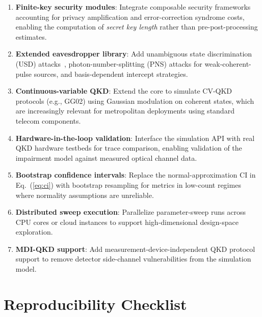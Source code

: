\documentclass[journal]{IEEEtran}
\begin{document}
\begin{enumerate}
  \item \textbf{Finite-key security modules}: Integrate composable
        security frameworks~\cite{tomamichel2012} accounting for
        privacy amplification and error-correction syndrome costs,
        enabling the computation of \emph{secret key length} rather
        than pre-post-processing estimates.

  \item \textbf{Extended eavesdropper library}: Add unambiguous state
        discrimination (USD) attacks~\cite{ivanovic1987},
        photon-number-splitting (PNS) attacks for weak-coherent-pulse
        sources, and basis-dependent intercept strategies.

  \item \textbf{Continuous-variable QKD}: Extend the core to simulate
        CV-QKD protocols (e.g., GG02) using Gaussian modulation on
        coherent states, which are increasingly relevant for
        metropolitan deployments using standard telecom components.

  \item \textbf{Hardware-in-the-loop validation}: Interface the
        simulation API with real QKD hardware testbeds for trace
        comparison, enabling validation of the impairment model
        against measured optical channel data.

  \item \textbf{Bootstrap confidence intervals}: Replace the
        normal-approximation CI in Eq.~(\ref{eq:ci}) with bootstrap
        resampling for metrics in low-count regimes where normality
        assumptions are unreliable.

  \item \textbf{Distributed sweep execution}: Parallelize
        parameter-sweep runs across CPU cores or cloud instances to
        support high-dimensional design-space exploration.

  \item \textbf{MDI-QKD support}: Add measurement-device-independent
        QKD protocol support to remove detector side-channel
        vulnerabilities from the simulation model.
\end{enumerate}

\appendices

\section{Reproducibility Checklist}
\label{app:checklist}
\end{document}
